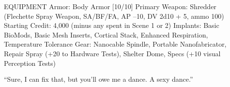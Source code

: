 EQUIPMENT
Armor: Body Armor [10/10]
Primary Weapon: Shredder (Flechette Spray Weapon, SA/BF/FA, AP –10, DV 2d10 + 5, ammo 100)
Starting Credit: 4,000 (minus any spent in Scene 1 or 2) 
Implants: Basic BioMods, Basic Mesh Inserts, Cortical Stack, Enhanced Respiration, Temperature Tolerance
Gear: Nanocable Spindle, Portable Nanofabricator, Repair Spray (+20 to Hardware Tests), Shelter Dome, Specs (+10 visual Perception Tests)

“Sure, I can fix that, but you'll owe me a dance. A sexy dance.”


